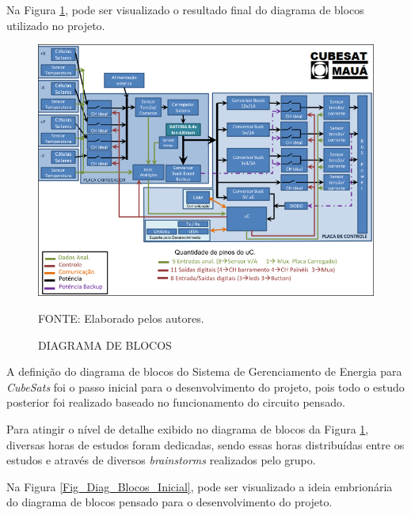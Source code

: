 \documentclass[
	12pt,				%
	openright,			%
	oneside,			%
	a4paper,			%
	english,			%
	french,				%
	spanish,			%
	brazil,				%
	oldfontcommands
	]{abntex2}
\begin{document}
	Na Figura \ref{Fig_Diag_Blocos_Final}, pode ser visualizado o resultado final do diagrama de blocos utilizado no projeto.
	
	\begin{figure}[th]
		\caption{DIAGRAMA DE BLOCOS}
		\label{Fig_Diag_Blocos_Final}
		\centering
		\includegraphics[width=1.0\linewidth]{./figs/diag_blocos}
			
		\begin{small}
			FONTE: Elaborado pelos autores.
		\end{small}		
	\end{figure}
	\pagebreak
	
	A definição do diagrama de blocos do Sistema de Gerenciamento de Energia para \textit{CubeSats} foi o passo inicial para o desenvolvimento do projeto, pois todo o estudo posterior foi realizado baseado no funcionamento do circuito pensado.

	Para atingir o nível de detalhe exibido no diagrama de blocos da Figura \ref{Fig_Diag_Blocos_Final}, diversas horas de estudos foram dedicadas, sendo essas horas distribuídas entre os estudos e através de diversos \textit{brainstorms} realizados pelo grupo.
	
	Na Figura \ref{Fig_Diag_Blocos_Inicial}, pode ser visualizado a ideia embrionária do diagrama de blocos pensado para o desenvolvimento do projeto.
		
\end{document}
